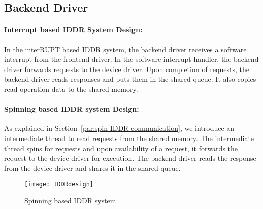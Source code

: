 \subsection{Backend Driver}
\paragraph{Interrupt based IDDR System Design:}
In the interRUPT based IDDR system, the backend driver receives a software interrupt from the frontend driver. In the software interrupt handler, the backend driver forwards requests to the device driver. Upon completion of requests, the backend driver reads responses and puts them in the shared queue. It also copies read operation data to the shared memory. 

\paragraph{Spinning based IDDR system Design:}
As explained in Section~\ref{par:spin IDDR communication}, we introduce an intermediate thread to read requests from the shared memory. The intermediate thread spins for requests and upon availability of a request, it forwards the request to the device driver for execution. The backend driver reads the response from the device driver and shares it in the shared queue.
\begin{figure}[!ht]
\centering
\texttt{[image: IDDRdesign]}
\caption{Spinning based IDDR system}
\label{fig:new IDDR system}
\end{figure}

    
